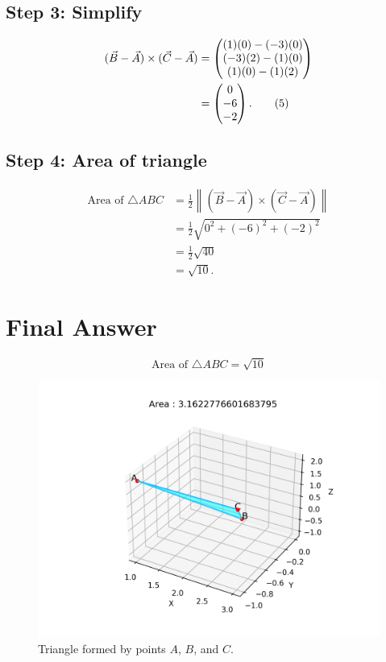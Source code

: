 \documentclass[12pt]{article}
\begin{document}
\subsection*{Step 3: Simplify}
\begin{align}
(\Vec{B}-\Vec{A})\times(\Vec{C}-\Vec{A})
&= \begin{pmatrix}
(1)(0) - (-3)(0) \\
(-3)(2) - (1)(0) \\
(1)(0) - (1)(2)
\end{pmatrix} \\
&= \begin{pmatrix}0 \\ -6 \\ -2\end{pmatrix}. \tag{5}
\end{align}

\subsection*{Step 4: Area of triangle}
\begin{align}
\text{Area of } \triangle ABC &= \tfrac{1}{2}\left\|(\Vec{B}-\Vec{A})\times(\Vec{C}-\Vec{A})\right\| \\
&= \tfrac{1}{2}\sqrt{0^2+(-6)^2+(-2)^2} \\
&= \tfrac{1}{2}\sqrt{40} \\
&= \sqrt{10}. \tag{6}
\end{align}

\section*{Final Answer}
\[
\boxed{\text{Area of } \triangle ABC = \sqrt{10}}
\]

\begin{figure}[h!]
    \centering
    \includegraphics[width=0.65\linewidth]{figs/fig.png}
    \caption{Triangle formed by points $A$, $B$, and $C$.}
\end{figure}
\end{document}
